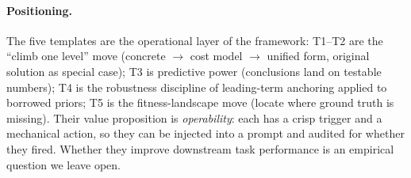 \paragraph{Positioning.}
The five templates are the operational layer of the framework: T1--T2 are the
``climb one level'' move (concrete $\to$ cost model $\to$ unified form, original
solution as special case); T3 is predictive power (conclusions land on testable
numbers); T4 is the robustness discipline of leading-term anchoring applied to
borrowed priors; T5 is the fitness-landscape move (locate where ground truth is
missing). Their value proposition is \emph{operability}: each has a crisp
trigger and a mechanical action, so they can be injected into a prompt and
audited for whether they fired. Whether they improve downstream task performance
is an empirical question we leave open.
